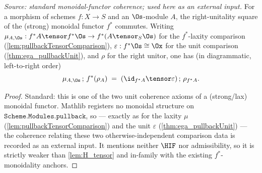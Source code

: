 \begin{theorem}
  \label{thm:ega_pullback_rightUnitality}
  \textit{Source: standard monoidal-functor coherence; used here as an external input.}
  For a morphism of schemes $f : X \to S$ and an $\Os$-module $A$, the right-unitality square of
  the (strong) monoidal functor $f^*$ commutes. Writing $\mu_{A,\Os} : f^*A \tensor f^*\Os \to
  f^*(A \tensor_S \Os)$ for the $f^*$-laxity comparison (\cref{lem:pullbackTensorComparison}),
  $\varepsilon : f^*\Os \cong \Ox$ for the unit comparison (\cref{thm:ega_pullbackUnit}), and
  $\rho$ for the right unitor, one has (in diagrammatic, left-to-right order)
  \[
    \mu_{A,\Os} \,;\, f^*(\rho_A) \;=\; (\id_{f^*A} \tensor \varepsilon) \,;\, \rho_{f^*A}.
  \]
  \begin{proof}
    Standard: this is one of the two unit coherence axioms of a (strong/lax) monoidal functor.
    Mathlib registers no monoidal structure on $\mathtt{Scheme.Modules.pullback}$, so — exactly as
    for the laxity $\mu$ (\cref{lem:pullbackTensorComparison}) and the unit $\varepsilon$
    (\cref{thm:ega_pullbackUnit}) — the coherence relating these two otherwise-independent
    comparison data is recorded as an external input. It mentions neither $\HIF$ nor admissibility,
    so it is strictly weaker than \cref{lem:H_tensor} and in-family with the existing
    $f^*$-monoidality anchors.
  \end{proof}
\end{theorem}

